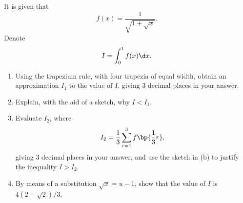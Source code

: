 \begin{problem}
    It is given that \[f(x) = \frac1{\sqrt{1 + \sqrt{x}}}.\] Denote \[I = \int_0^1 f(x) \d x.\]

    \begin{enumerate}
        \item Using the trapezium rule, with four trapezia of equal width, obtain an approximation $I_1$ to the value of $I$, giving 3 decimal places in your answer.
        \item Explain, with the aid of a sketch, why $I < I_1$.
        \item Evaluate $I_2$, where \[I_2 = \frac13 \sum_{r = 1}^3 f\bp{\frac13 r},\] giving 3 decimal places in your answer, and use the sketch in (b) to justify the inequality $I > I_2$.
        \item By means of a substitution $\sqrt{x} = u -1$, show that the value of $I$ is $4(2 - \sqrt2)/3$.
    \end{enumerate}
\end{problem}
